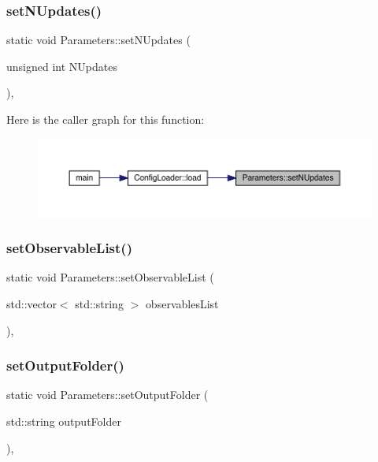 \subsubsection{\texorpdfstring{setNUpdates()}{setNUpdates()}}
{\footnotesize\ttfamily static void Parameters\+::set\+N\+Updates (\begin{DoxyParamCaption}\item[{unsigned int}]{N\+Updates }\end{DoxyParamCaption})\hspace{0.3cm}{\ttfamily [inline]}, {\ttfamily [static]}}

Here is the caller graph for this function\+:\nopagebreak
\begin{figure}[H]
\begin{center}
\leavevmode
\includegraphics[width=350pt]{class_parameters_ae443546fea1f1ceaf3683cb368f7f5bb_icgraph}
\end{center}
\end{figure}
\mbox{\label{class_parameters_a6fb3ff88b2a2c9d5d4f2c3b64e672fa1}} 
\subsubsection{\texorpdfstring{setObservableList()}{setObservableList()}}
{\footnotesize\ttfamily static void Parameters\+::set\+Observable\+List (\begin{DoxyParamCaption}\item[{std\+::vector$<$ std\+::string $>$}]{observables\+List }\end{DoxyParamCaption})\hspace{0.3cm}{\ttfamily [inline]}, {\ttfamily [static]}}

\mbox{\label{class_parameters_a58dff6fbcc88bb916b9590057bf338ff}} 
\subsubsection{\texorpdfstring{setOutputFolder()}{setOutputFolder()}}
{\footnotesize\ttfamily static void Parameters\+::set\+Output\+Folder (\begin{DoxyParamCaption}\item[{std\+::string}]{output\+Folder }\end{DoxyParamCaption})\hspace{0.3cm}{\ttfamily [inline]}, {\ttfamily [static]}}

